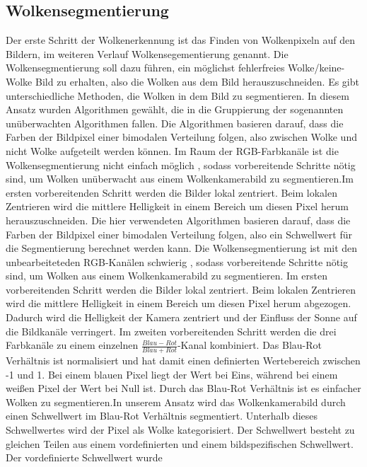\documentclass[a4paper,11pt,twoside,german]{article}
\newcommand{\absatz}{\smallbreak}
\begin{document}
\subsection{Wolkensegmentierung}
Der erste Schritt der Wolkenerkennung ist das Finden von Wolkenpixeln auf den
Bildern, im weiteren Verlauf Wolkensegementierung genannt. Die
Wolkensegmentierung soll dazu führen, ein möglichst fehlerfreies
Wolke/keine-Wolke Bild zu erhalten, also die Wolken aus dem Bild
herauszuschneiden.\absatz 
Es gibt unterschiedliche Methoden, die Wolken in dem
Bild zu segmentieren. In diesem Ansatz wurden Algorithmen gewählt, die in
die Gruppierung der sogenannten unüberwachten Algorithmen fallen. Die
Algorithmen basieren darauf, dass die Farben der Bildpixel einer bimodalen
Verteilung folgen, also zwischen Wolke und nicht Wolke aufgeteilt werden können.
Im Raum der RGB-Farbkanäle ist die Wolkensegmentierung nicht einfach möglich
\citep{dev_14_color}, sodass vorbereitende Schritte nötig sind, um Wolken
unüberwacht aus einem Wolkenkamerabild zu segmentieren.\absatz Im ersten
vorbereitenden Schritt werden die Bilder lokal zentriert. Beim lokalen
Zentrieren wird die mittlere Helligkeit in einem Bereich um diesen Pixel herum
herauszuschneiden.\absatz
Die hier verwendeten Algorithmen basieren darauf, dass die Farben der Bildpixel einer bimodalen
Verteilung folgen, also ein Schwellwert für die Segmentierung berechnet werden kann.
Die Wolkensegmentierung ist mit den unbearbeiteteden RGB-Kanälen schwierig \citep{dev_14_color}, sodass vorbereitende Schritte nötig sind, um Wolken aus einem Wolkenkamerabild zu segmentieren.\absatz
Im ersten vorbereitenden Schritt werden die Bilder lokal zentriert. Beim lokalen
Zentrieren wird die mittlere Helligkeit in einem Bereich um diesen Pixel herum
abgezogen. Dadurch wird die Helligkeit der Kamera zentriert und der Einfluss der
Sonne auf die Bildkanäle verringert. Im zweiten vorbereitenden Schritt werden
die drei Farbkanäle zu einem einzelnen $\frac{Blau-Rot}{Blau+Rot}$-Kanal
kombiniert. Das Blau-Rot Verhältnis ist normalisiert und hat damit einen
definierten Wertebereich zwischen -1 und 1. Bei einem blauen Pixel liegt der
Wert bei Eins, während bei einem weißen Pixel der Wert bei Null ist. Durch das
Blau-Rot Verhältnis ist es einfacher Wolken zu segmentieren.\absatz In unserem
Ansatz wird das Wolkenkamerabild durch einen Schwellwert im Blau-Rot Verhältnis
segmentiert. Unterhalb dieses Schwellwertes wird der Pixel als Wolke
kategorisiert. Der Schwellwert besteht zu gleichen Teilen aus einem vordefinierten
und einem bildspezifischen Schwellwert. Der vordefinierte Schwellwert wurde
\end{document}
